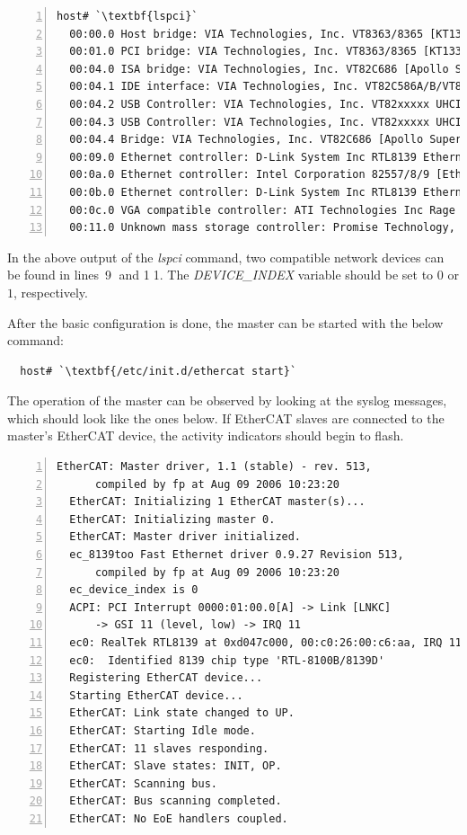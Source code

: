 \documentclass[a4paper,12pt,BCOR6mm,bibtotoc,idxtotoc]{scrbook}
\begin{document}
\begin{lstlisting}[numbers=left,basicstyle=\ttfamily\scriptsize]
  host# `\textbf{lspci}`
  00:00.0 Host bridge: VIA Technologies, Inc. VT8363/8365 [KT133/KM133] (rev 03)
  00:01.0 PCI bridge: VIA Technologies, Inc. VT8363/8365 [KT133/KM133 AGP]
  00:04.0 ISA bridge: VIA Technologies, Inc. VT82C686 [Apollo Super South] (rev 40)
  00:04.1 IDE interface: VIA Technologies, Inc. VT82C586A/B/VT82C686/A/B/VT823x/A/C...
  00:04.2 USB Controller: VIA Technologies, Inc. VT82xxxxx UHCI USB 1.1 Controller...
  00:04.3 USB Controller: VIA Technologies, Inc. VT82xxxxx UHCI USB 1.1 Controller...
  00:04.4 Bridge: VIA Technologies, Inc. VT82C686 [Apollo Super ACPI] (rev 40)
  00:09.0 Ethernet controller: D-Link System Inc RTL8139 Ethernet (rev 10)
  00:0a.0 Ethernet controller: Intel Corporation 82557/8/9 [Ethernet Pro 100] (rev 08)
  00:0b.0 Ethernet controller: D-Link System Inc RTL8139 Ethernet (rev 10)
  00:0c.0 VGA compatible controller: ATI Technologies Inc Rage XL (rev 27)
  00:11.0 Unknown mass storage controller: Promise Technology, Inc. PDC20265...
\end{lstlisting}

In the above output of the \textit{lspci} command, two compatible
network devices can be found in lines~\textcircled{\tiny 9} and
\textcircled{\tiny 11}. The \textit{DEVICE\_INDEX} variable should be
set to $0$ or $1$, respectively.

After the basic configuration is done, the master can be started with
the below command:

\begin{lstlisting}
  host# `\textbf{/etc/init.d/ethercat start}`
\end{lstlisting}

The operation of the master can be observed by looking at the
syslog messages, which should look like the ones below.
If EtherCAT slaves are connected to the master's EtherCAT device, the
activity indicators should begin to flash.

\begin{lstlisting}[numbers=left]
  EtherCAT: Master driver, 1.1 (stable) - rev. 513,
      compiled by fp at Aug 09 2006 10:23:20
  EtherCAT: Initializing 1 EtherCAT master(s)...
  EtherCAT: Initializing master 0.
  EtherCAT: Master driver initialized.
  ec_8139too Fast Ethernet driver 0.9.27 Revision 513,
      compiled by fp at Aug 09 2006 10:23:20
  ec_device_index is 0
  ACPI: PCI Interrupt 0000:01:00.0[A] -> Link [LNKC]
      -> GSI 11 (level, low) -> IRQ 11
  ec0: RealTek RTL8139 at 0xd047c000, 00:c0:26:00:c6:aa, IRQ 11
  ec0:  Identified 8139 chip type 'RTL-8100B/8139D'
  Registering EtherCAT device...
  Starting EtherCAT device...
  EtherCAT: Link state changed to UP.
  EtherCAT: Starting Idle mode.
  EtherCAT: 11 slaves responding.
  EtherCAT: Slave states: INIT, OP.
  EtherCAT: Scanning bus.
  EtherCAT: Bus scanning completed.
  EtherCAT: No EoE handlers coupled.
\end{lstlisting}
\end{document}
